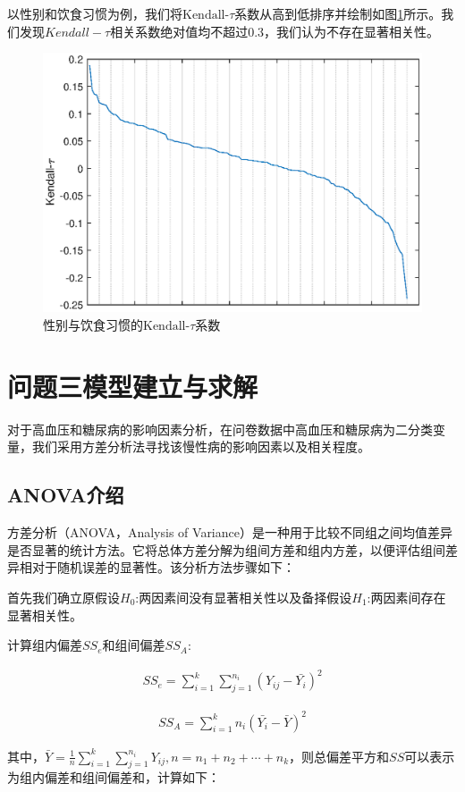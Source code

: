 \documentclass{cumcmthesis}
\begin{document}
以性别和饮食习惯为例，我们将$\text{Kendall-}\tau$系数从高到低排序并绘制如图\ref{3}所示。我们发现${Kendall-}\tau$相关系数绝对值均不超过0.3，我们认为不存在显著相关性。
\begin{figure}[H]
\centering
\includegraphics{figures/A1.eps}
\caption{性别与饮食习惯的$\text{Kendall-}\tau$系数}\label{3}
\end{figure}
\clearpage
\section{问题三模型建立与求解}
对于高血压和糖尿病的影响因素分析，在问卷数据中高血压和糖尿病为二分类变量，我们采用方差分析法寻找该慢性病的影响因素以及相关程度。
\subsection{ANOVA介绍}
方差分析（ANOVA，Analysis of Variance）是一种用于比较不同组之间均值差异是否显著的统计方法。它将总体方差分解为组间方差和组内方差，以便评估组间差异相对于随机误差的显著性。该分析方法步骤如下：

首先我们确立原假设$H_0$:两因素间没有显著相关性以及备择假设$H_1$:两因素间存在显著相关性。

计算组内偏差$SS_e$和组间偏差$SS_A$:

\begin{eqnarray}
SS_e=\sum_{i=1}^k\sum_{j=1}^{n_i}(Y_{ij}-\bar{Y_i})^2
\end{eqnarray}

\begin{eqnarray}
SS_A=\sum_{i=1}^kn_i(\bar{Y_i}-\bar{Y})^2
\end{eqnarray}

其中，$\bar{Y}=\frac{1}{n}\sum_{i=1}^{k}\sum_{j=1}^{n_i}Y_{ij},n=n_1+n_2+\cdots+n_k$，则总偏差平方和$SS$可以表示为组内偏差和组间偏差和，计算如下：
\end{document}
